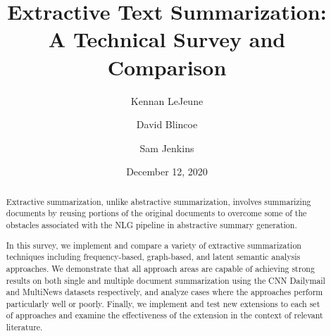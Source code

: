 \documentclass[11pt]{report}
\title{Extractive Text Summarization:\\A Technical Survey and Comparison}
\author[1]{Kennan LeJeune}
\author[1]{David Blincoe}
\author[1]{Sam Jenkins}
\affil[1]{\textit{Department of Computer and Data Sciences\\Case Western Reserve University}}
\date{December 12, 2020}
\begin{document}
\maketitle
\begin{abstract}
  Extractive summarization, unlike abstractive summarization, involves summarizing documents by reusing portions
  of the original documents to overcome some of the obstacles associated with the NLG pipeline in
  abstractive summary generation.

  In this survey, we implement and compare a variety of
  extractive summarization techniques \autocite{brief-summarization-survey, text-summarization-techniques} including frequency-based, graph-based,
  and latent semantic analysis approaches. We demonstrate that all approach areas are capable of achieving strong
  results on both single and multiple document summarization using the
  CNN Dailymail \autocite*[]{dataset-cnn} and MultiNews \autocite*[]{dataset-multinews}
  datasets respectively, and analyze
  cases where the approaches perform particularly well or poorly. Finally, we implement and test
  new extensions to each set of
  approaches and examine the effectiveness of the extension in the context of relevant literature.
\end{abstract}
\tableofcontents{}






\newpage
\printbibliography{}
\end{document}

